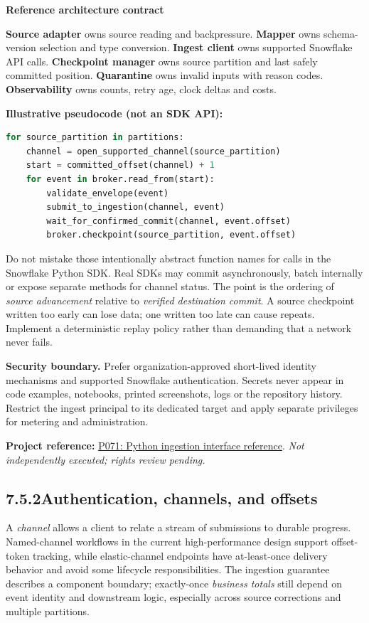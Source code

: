 \documentclass[11pt,twoside]{article}
\newcommand{\topic}[2]{\subsection*{#1\quad #2}}
\newcommand{\repo}[2]{\par\begingroup\fontsize{8.0}{9.6}\selectfont\sffamily\color{inkgray}\textbf{Project reference:} \href{#2}{#1}. \textit{Not independently executed; rights review pending.}\par\endgroup}
\begin{document}
\begin{whitebox}\textbf{Reference architecture contract}\par
\textbf{Source adapter} owns source reading and backpressure. \textbf{Mapper} owns schema-version selection and type conversion. \textbf{Ingest client} owns supported Snowflake API calls. \textbf{Checkpoint manager} owns source partition and last safely committed position. \textbf{Quarantine} owns invalid inputs with reason codes. \textbf{Observability} owns counts, retry age, clock deltas and costs.\end{whitebox}
\textbf{Illustrative pseudocode (not an SDK API):}
\begin{lstlisting}[language=Python]
for source_partition in partitions:
    channel = open_supported_channel(source_partition)
    start = committed_offset(channel) + 1
    for event in broker.read_from(start):
        validate_envelope(event)
        submit_to_ingestion(channel, event)
        wait_for_confirmed_commit(channel, event.offset)
        broker.checkpoint(source_partition, event.offset)
\end{lstlisting}
Do not mistake those intentionally abstract function names for calls in the Snowflake Python SDK. Real SDKs may commit asynchronously, batch internally or expose separate methods for channel status. The point is the ordering of \emph{source advancement} relative to \emph{verified destination commit}. A source checkpoint written too early can lose data; one written too late can cause repeats. Implement a deterministic replay policy rather than demanding that a network never fails.

\textbf{Security boundary.} Prefer organization-approved short-lived identity mechanisms and supported Snowflake authentication. Secrets never appear in code examples, notebooks, printed screenshots, logs or the repository history. Restrict the ingest principal to its dedicated target and apply separate privileges for metering and administration.
\repo{P071: Python ingestion interface reference}{https://github.com/snowflakedb/snowflake-ingest-python}
\newpage
\topic{7.5.2}{Authentication, channels, and offsets}
A \emph{channel} allows a client to relate a stream of submissions to durable progress. Named-channel workflows in the current high-performance design support offset-token tracking, while elastic-channel endpoints have at-least-once delivery behavior and avoid some lifecycle responsibilities. The ingestion guarantee describes a component boundary; exactly-once \emph{business totals} still depend on event identity and downstream logic, especially across source corrections and multiple partitions.
\end{document}
